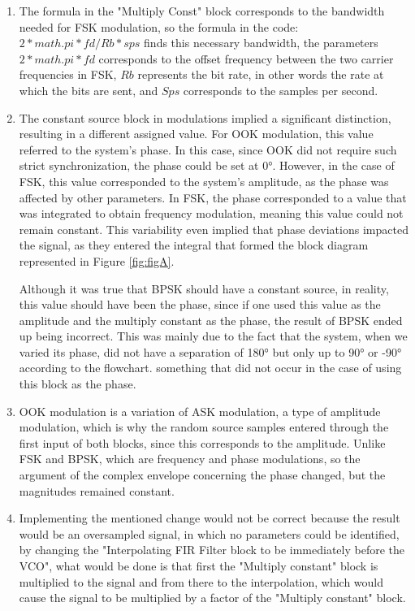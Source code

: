 \documentclass{journal}[IEEEtran, twocolumn]             %
\begin{document}
\begin{multicols}{2}
\begin{enumerate}
    \item The formula in the "Multiply Const" block corresponds to the bandwidth needed for FSK modulation, so the formula in the code: $2*math.pi*fd/Rb*sps$ finds this necessary bandwidth, the parameters $2*math.pi*fd$ corresponds to the offset frequency between the two carrier frequencies in FSK, $Rb$ represents the bit rate, in other words the rate at which the bits are sent, and $Sps$ corresponds to the samples per second.

    \item The constant source block in modulations implied a significant distinction, resulting in a different assigned value. For OOK modulation, this value referred to the system's phase. In this case, since OOK did not require such strict synchronization, the phase could be set at 0°. However, in the case of FSK, this value corresponded to the system's amplitude, as the phase was affected by other parameters. In FSK, the phase corresponded to a value that was integrated to obtain frequency modulation, meaning this value could not remain constant. This variability even implied that phase deviations impacted the signal, as they entered the integral that formed the block diagram represented in Figure \ref{fig:figA}.

    Although it was true that BPSK should have a constant source, in reality, this value should have been the phase, since if one used this value as the amplitude and the multiply constant as the phase, the result of BPSK ended up being incorrect. This was mainly due to the fact that the system, when we varied its phase, did not have a separation of 180° but only up to 90° or -90° according to the flowchart.
    something that did not occur in the case of using this block as the phase.

    \item OOK modulation is a variation of ASK modulation, a type of amplitude modulation, which is why the random source samples entered through the first input of both blocks, since this corresponds to the amplitude. Unlike FSK and BPSK, which are frequency and phase modulations, so the argument of the complex envelope concerning the phase changed, but the magnitudes remained constant.

    \item Implementing the mentioned change would not be correct because the result would be an oversampled signal, in which no parameters could be identified, by changing the "Interpolating FIR Filter block to be immediately before the VCO", what would be done is that first the "Multiply constant" block is multiplied to the signal and from there to the interpolation, which would cause the signal to be multiplied by a factor of the "Multiply constant" block.


\end{enumerate}
\end{multicols}
\end{document}
